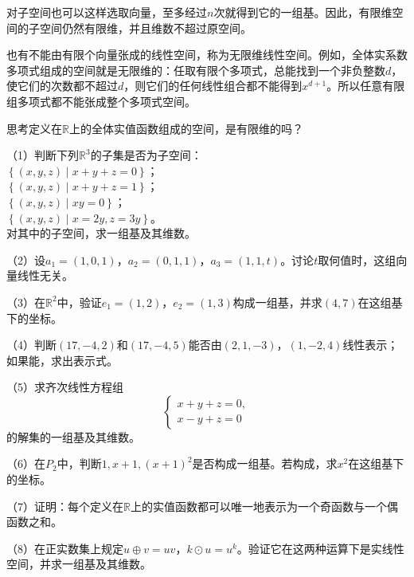对子空间也可以这样选取向量，至多经过\(n\)次就得到它的一组基。因此，有限维空间的子空间仍然有限维，并且维数不超过原空间。

也有不能由有限个向量张成的线性空间，称为{\heiti{}无限维线性空间}。例如，全体实系数多项式组成的空间就是无限维的：任取有限个多项式，总能找到一个非负整数\(d\)，使它们的次数都不超过\(d\)，则它们的任何线性组合都不能得到\(x^{d + 1}\)。所以任意有限组多项式都不能张成整个多项式空间。

{\kaiti{}思考\quad 定义在\(\mathbb{R}\)上的全体实值函数组成的空间，是有限维的吗？}

\begin{exercise}
（1）判断下列\(\mathbb{R}^{3}\)的子集是否为子空间：\\
\(\left\{ \left( x , y , z \right) \mid x + y + z = 0 \right\}\)；\\
\(\left\{ \left( x , y , z \right) \mid x + y + z = 1 \right\}\)；\\
\(\left\{ \left( x , y , z \right) \mid x y = 0 \right\}\)；\\
\(\left\{ \left( x , y , z \right) \mid x = 2 y , z = 3 y \right\}\)。\\
对其中的子空间，求一组基及其维数。

（2）设\(a_{1} = \left( 1 , 0 , 1 \right)\)，\(a_{2} = \left( 0 , 1 , 1 \right)\)，\(a_{3} = \left( 1 , 1 , t \right)\)。讨论\(t\)取何值时，这组向量线性无关。

（3）在\(\mathbb{R}^{2}\)中，验证\(e_{1} = \left( 1 , 2 \right)\)，\(e_{2} = \left( 1 , 3 \right)\)构成一组基，并求\(\left( 4 , 7 \right)\)在这组基下的坐标。

（4）判断\(\left( 17 , - 4 , 2 \right)\)和\(\left( 17 , - 4 , 5 \right)\)能否由\(\left( 2 , 1 , - 3 \right)\)，\(\left( 1 , - 2 , 4 \right)\)线性表示；如果能，求出表示式。

（5）求齐次线性方程组
\begin{equation}
    \left\{ \begin{matrix}x + y + z = 0 , \\ x - y + z = 0\end{matrix} \right.
\end{equation}
的解集的一组基及其维数。

（6）在\(P_{2}\)中，判断\(1 , x + 1 , \left( x + 1 \right)^{2}\)是否构成一组基。若构成，求\(x^{2}\)在这组基下的坐标。

（7）证明：每个定义在\(\mathbb{R}\)上的实值函数都可以唯一地表示为一个奇函数与一个偶函数之和。

（8）在正实数集上规定\(u \oplus v = u v\)，\(k \odot u = u^{k}\)。验证它在这两种运算下是实线性空间，并求一组基及其维数。
\end{exercise}
\newpage
